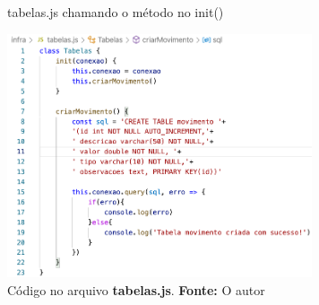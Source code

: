 \documentclass{beamer}
\begin{document}
    \begin{frame}{tabelas.js chamando o método no init()}
         \begin{center}
    	\includegraphics[width=90mm]{resources/aula6_9.png}\\
        \tiny{ Código no arquivo \textbf{tabelas.js}. \textbf{Fonte:} O autor}
     \end{center}   
    \end{frame}

%
%
  
\end{document}
